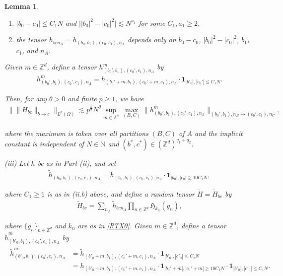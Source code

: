 \documentclass[%
11pt,  reqno]{amsart}
\newtheorem{lemma}[theorem]{Lemma}
\newcommand{\1}{\hspace{0.2mm}\text{I}\hspace{0.2mm}}
\newcommand{\noi}{\noindent}
\newcommand{\Z}{\mathbb{Z}}
\newcommand{\wt}{\widetilde}
\renewcommand{\O}{\Omega}
\newcommand{\les}{\lesssim}
\newcommand{\ind}{\mathbf 1}
\newcommand{\N}{\mathbb{N}}
\numberwithin{equation}{section}
\numberwithin{theorem}{section}
\newcommand{\Hf}{\mathfrak{H}}
\begin{document}
\begin{lemma}
\begin{enumerate}
\smallskip

\item[(ii.b)]
 $|b_0-c_0| \le C_1 N$ and $\big||b_0|^2 -|c_0|^2\big| \les N^{a_1}$ for some $C_1, a_1 \ge 2$, 

\smallskip
\item[(ii.c)] the tensor $h_{bcn_A}
= h_{(b_0, b_1), (c_0, c_1), n_A}$  depends only on $b_0-c_0$, $|b_0|^2 -  |c_0|^2$, 
$b_1$, $c_1$, and $n_A$. 
\end{enumerate}

\noi 

\smallskip

\noi
Given $m \in \Z^d$, define a tensor $h^m_{(b_0', b_1), (c_0', c_1), n_A} $ 
by 
\begin{align}
h^m_{(b_0', b_1), (c_0', c_1), n_A} 
= h_{(b_0'+m, b_1),(c_0'+m, c_1), n_A} \cdot \ind_{|b'_0|, |c_0'| \le C_1 N}.
\label{XY2}
\end{align}

\noi
Then,  
 for any $\theta > 0$ and finite $p \ge 1$, we have
\begin{align}
\big\| \| H_{bc} \|_{b \to c} \big\|_{L^p(\O)} 
\les p^{\frac k2} N^{\theta}
\sup_{m \in \Z^d}
 \max_{(B,C)} \| h^m_{(b_0', b_1), (c_0', c_1), n_A}  \|_{(b_0', b_1), n_B \to (c_0', c_1),  n_C}, 
\label{RTX0c}
\end{align}


\noi
where 
the maximum is taken over  all partitions $(B,C)$ of $A$
and 
the implicit constant is independent of $N \in \N$
and $(b^*, c^*) \in (\Z^d)^{q_1 + q_2}$.


\medskip





\noi
\textup{(iii)}
Let $h$ be as in Part (ii), and set 
\begin{align*}
\wt h_{(b_0, b_1), (c_0, c_1), n_A} 
= h_{(b_0, b_1), (c_0, c_1), n_A} 
\cdot 
 \ind_{|b_0|, |c_0| \ge 10C_1 N}, 
\end{align*}

\noi
where $C_1 \ge 1$ is as in 
(ii.b) above, 
and 
 define  a random  tensor $\wt H = \wt H_{bc}$ by
\begin{align*}
\wt H_{bc} =  \sum_{n_A} \wt h_{bcn_A} 
\prod_{n \in \Z^d} 
\Hf_{k_n}(g_{n}), 
\end{align*}

\noi
where
$\{g_n\}_{n \in \Z^d}$ and $k_n$ are as in \eqref{RTX0}.
Given $m \in \Z^d$, 
define a tensor $\wt h^m_{(b'_0, b_1), (c_0', c_1), n_A} $ by 
\begin{align}
\begin{split}
\wt h^m_{(b'_0, b_1), (c_0', c_1), n_A} 
& = \wt h_{(b'_0+m, b_1),(c_0'+m, c_1), n_A} \cdot \ind_{|b'_0|, |c'_0| \le C_1 N}\\
& =  h_{(b'_0+m, b_1),(c_0'+m, c_1), n_A} 
\cdot  \ind_{|b_0'+m|, |c_0'+m| \ge 10C_1 N} 
\cdot \ind_{|b'_0|, |c'_0| \le C_1 N}.
\end{split}
\label{XY4}
\end{align}



\end{lemma}
\end{document}
